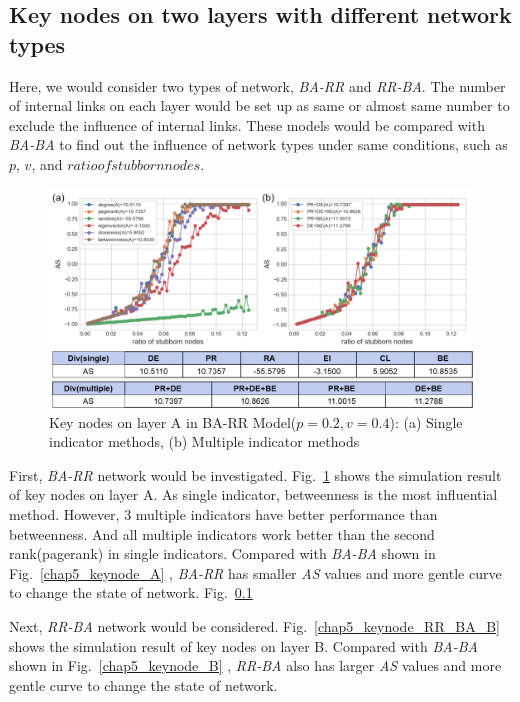 \subsection{Key nodes on two layers with different network types}
Here, we would consider two types of network, \textit{BA-RR} and \textit{RR-BA}. The number of internal links on each layer would be set up as same or almost same number to exclude the influence of internal links. These models would be compared with \textit{BA-BA} to find out the influence of network types under same conditions, such as $p$, $v$, and $ratio of stubborn nodes$.  
\begin{figure}[!htb]
	\centering
	\includegraphics[width=\hsize]{figure/chap5_keynode_BA_RR_A.png}
	\caption{Key nodes on layer A in BA-RR Model($p=0.2, v=0.4$):
		(a) Single indicator methods, (b) Multiple indicator methods}
	\label{chap5_keynode_BA_RR_A}
\end{figure}
First, \textit{BA-RR} network would be investigated.
Fig.~\ref{chap5_keynode_BA_RR_A} shows the simulation result of key nodes on layer A. As single indicator, betweenness is the most influential method. However, 3 multiple indicators have better performance than betweenness. And all multiple indicators work better than the second rank(pagerank) in single indicators. Compared with \textit{BA-BA} shown in Fig.~\ref{chap5_keynode_A} , \textit{BA-RR} has smaller \textit{AS} values and more gentle curve to change the state of network.  
Fig.~\ref{}


Next, \textit{RR-BA} network would be considered. Fig.~\ref{chap5_keynode_RR_BA_B} shows the simulation result of key nodes on layer B. Compared with \textit{BA-BA} shown in Fig.~\ref{chap5_keynode_B} , \textit{RR-BA} also has larger \textit{AS} values and more gentle curve to change the state of network.  

